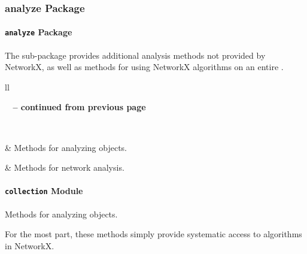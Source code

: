 \documentclass[letterpaper,10pt,english]{sphinxmanual}
\begin{document}
\subsubsection{analyze Package}
\label{tethne.analyze:analyze-package}\label{tethne.analyze::doc}

\paragraph{\texttt{analyze} Package}
\label{tethne.analyze:id1}\label{tethne.analyze:module-tethne.analyze}
The {\hyperref[tethne.analyze:module-tethne.analyze]{}} sub-package provides additional analysis methods not
provided by NetworkX, as well as methods for using NetworkX algorithms on
an entire {\hyperref[tethne:tethne.data.GraphCollection]{}}.

\begin{longtable}{ll}
\hline
\endfirsthead

%
{{\bfseries \tablename\ \thetable{} -- continued from previous page}} \\
\hline
\endhead

\hline {} \\ \hline
\endfoot

\hline
\endlastfoot


{\hyperref[tethne.analyze:module-tethne.analyze.collection]{}}
 & 
Methods for analyzing {\hyperref[tethne:tethne.data.GraphCollection]{}} objects.
\\\hline

{\hyperref[tethne.analyze:module-tethne.analyze.graph]{}}
 & 
Methods for network analysis.
\\\hline
\end{longtable}



\paragraph{\texttt{collection} Module}
\label{tethne.analyze:module-tethne.analyze.collection}\label{tethne.analyze:collection-module}
Methods for analyzing {\hyperref[tethne:tethne.data.GraphCollection]{}} objects.

For the most part, these methods simply provide systematic access to algorithms
in NetworkX.
\end{document}
